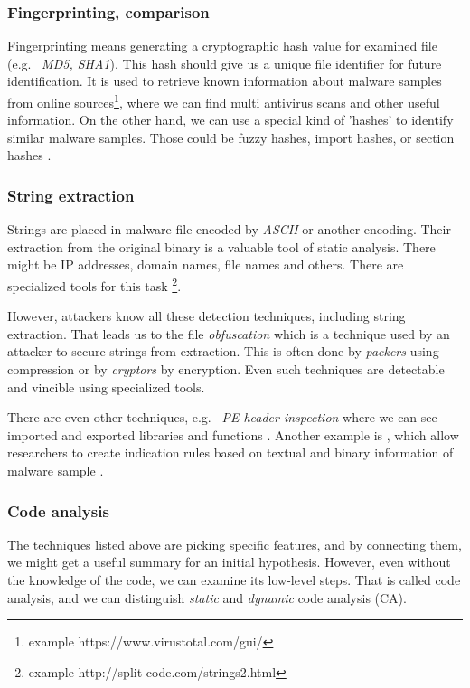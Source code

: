 \subsubsection{Fingerprinting, comparison}
Fingerprinting means generating a cryptographic hash value for examined file (e.g. \ \emph{MD5, SHA1}). This hash should give us a unique file identifier for future identification. It is used to retrieve known information about malware samples from online sources\footnote{example https://www.virustotal.com/gui/}, where we can find multi antivirus scans and other useful information. On the other hand, we can use a special kind of 'hashes' to identify similar malware samples. Those could be fuzzy hashes, import hashes, or section hashes \cite{KA2018}.

\subsubsection{String extraction}
Strings are placed in malware file encoded by \emph{ASCII} or another encoding. Their extraction from the original binary is a valuable tool of static analysis. There might be IP addresses, domain names, file names and others. There are specialized tools for this task \footnote{example http://split-code.com/strings2.html}. 

However, attackers know all these detection techniques, including string extraction. That leads us to the file \emph{obfuscation} which is a technique used by an attacker to secure strings from extraction. This is often done by \emph{packers} using compression or by \emph{cryptors} by encryption. Even such techniques are detectable and vincible using specialized tools.

There are even other techniques, e.g. \ \emph{PE header inspection} where we can see imported and exported libraries and functions \cite{Sikorski2012}. Another example is , which allow researchers to create indication rules based on textual and binary information of malware sample \cite{KA2018}.

\subsubsection{Code analysis}
The techniques listed above are picking specific features, and by connecting them, we might get a useful summary for an initial hypothesis. 
However, even without the knowledge of the code, we can examine its low-level steps. That is called code analysis, and we can distinguish \emph{static} and \emph{dynamic} code analysis (CA).

